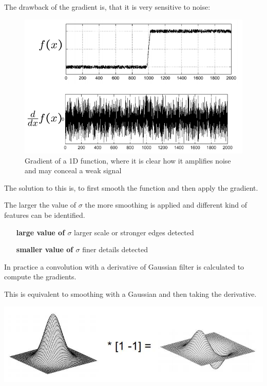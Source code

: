 \documentclass[x11names,11pt,a4paper]{article}
\theoremstyle{definition}
\begin{document}
The drawback of the gradient is, that it is very sensitive to noise:
\begin{figure}[H]
	\centering
	\includegraphics[width=0.7\linewidth]{noise_gradient}
	\caption{Gradient of a 1D function, where it is clear how it amplifies noise and may conceal a weak signal}
	\label{fig:noisegradient}
\end{figure}

\noindent
The solution to this is, to first smooth the function and then apply the gradient.

The larger the value of $\sigma$ the more smoothing is applied and different kind of features can be identified.
\begin{itemize}[leftmargin=*, labelindent=3.5cm, labelsep=0.5cm]
	\item[\textbf{large value of $\sigma$}] larger scale or stronger edges detected
	\item[\textbf{smaller value of $\sigma$}] finer details detected
\end{itemize}

\noindent
\begin{minipage}{0.6\textwidth}
	In practice a convolution with a derivative of Gaussian filter is calculated to compute the gradients.
	
	This is equivalent to smoothing with a Gaussian and then taking the derivative.
\end{minipage}
\begin{minipage}{0.4\textwidth}
	\begin{center}
		\includegraphics[width=0.6\linewidth]{img/derivative_gaussian_filter}
	\end{center}
\end{minipage}
\end{document}
